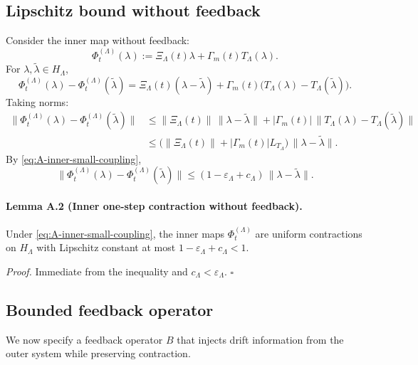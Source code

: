 \documentclass[11pt]{article}
\begin{document}
\subsection{Lipschitz bound without feedback}

Consider the inner map without feedback:
\[
\Phi_t^{(\Lambda)}(\lambda) := \Xi_\Lambda(t)\lambda + \Gamma_m(t) T_\Lambda(\lambda).
\]
For $\lambda,\tilde{\lambda}\in H_\Lambda$,
\[
\Phi_t^{(\Lambda)}(\lambda) - \Phi_t^{(\Lambda)}(\tilde{\lambda})
= \Xi_\Lambda(t)(\lambda-\tilde{\lambda})
 + \Gamma_m(t)\bigl(T_\Lambda(\lambda)-T_\Lambda(\tilde{\lambda})\bigr).
\]
Taking norms:
\begin{align*}
\|\Phi_t^{(\Lambda)}(\lambda) - \Phi_t^{(\Lambda)}(\tilde{\lambda})\|
&\le \|\Xi_\Lambda(t)\|\,\|\lambda-\tilde{\lambda}\|
   + |\Gamma_m(t)|\,\|T_\Lambda(\lambda)-T_\Lambda(\tilde{\lambda})\|\\
&\le \bigl(\|\Xi_\Lambda(t)\| + |\Gamma_m(t)| L_{T_\Lambda}\bigr)\,
     \|\lambda-\tilde{\lambda}\|.
\end{align*}
By \eqref{eq:A-inner-small-coupling},
\[
\|\Phi_t^{(\Lambda)}(\lambda) - \Phi_t^{(\Lambda)}(\tilde{\lambda})\|
\le (1-\varepsilon_\Lambda + c_\Lambda)\,\|\lambda-\tilde{\lambda}\|.
\]

\paragraph{Lemma A.2 (Inner one-step contraction without feedback).}
Under \eqref{eq:A-inner-small-coupling}, the inner maps $\Phi_t^{(\Lambda)}$ are uniform contractions on $H_\Lambda$ with Lipschitz constant at most $1-\varepsilon_\Lambda+c_\Lambda<1$.

\medskip
\noindent\emph{Proof.}
Immediate from the inequality and $c_\Lambda<\varepsilon_\Lambda$. \hfill$\square$

\subsection{Bounded feedback operator}

We now specify a feedback operator $B$ that injects drift information from the outer system while preserving contraction.
\end{document}
